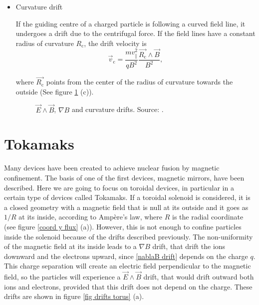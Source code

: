 \documentclass[a4paper,12pt,oneside]{book}
\begin{document}
\begin{itemize}

\item Curvature drift

If the guiding centre of a charged particle is following a curved field line, it undergoes a drift due to the centrifugal force. If the field lines have a constant radius of curvature $R_\text{c}$, the drift velocity is
%
\begin{equation}
\vec{v}_\text{c}=\dfrac{m v_{\parallel}^2}{q B^2} \dfrac{\vec{R_\text{c}} \wedge \vec{B}}{B^2},
\end{equation}

where $\vec{R_\text{c}}$ points from the center of the radius of curvature towards the outside (See figure \ref{fig EB y gradB drift} (c)).

\begin{figure}[htbp]
\centering
{}
\hfill
{}
\hfill
{}
\caption{$\vec{E} \wedge \vec{B}$, $\nabla B$ and curvature drifts. Source: \cite{Wesson}.}
\label{fig EB y gradB drift}
\end{figure}


\end{itemize}


\section{Tokamaks}
\label{sec_tokamaks}
Many devices have been created to achieve nuclear fusion by magnetic confinement. The basis of one of the first devices, magnetic mirrors, have been described. Here we are going to focus on toroidal devices, in particular in a certain type of devices called Tokamaks. If a toroidal solenoid is considered, it is a closed geometry with a magnetic field that is null at its outside and it goes as $1/R$ at its inside, according to Ampère's law, where $R$ is the radial coordinate (see figure \ref{coord y flux} (a)). However, this is not enough to confine particles inside the solenoid because of the drifts described previously. The non-uniformity of the magnetic field at its inside leads to a  $\nabla B$ drift, that drift the ions downward and the electrons upward, since \eqref{nablaB drift} depends on the charge $q$. This charge separation will create an electric field perpendicular to the magnetic field, so the particles will experience a $\vec{E} \wedge \vec{B}$ drift, that would drift outward both ions and electrons, provided that this drift does not depend on the charge. These drifts are shown in  figure \ref{fig drifts torus} (a).
\end{document}
